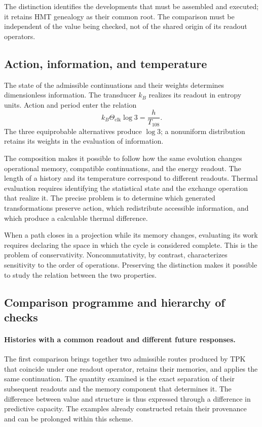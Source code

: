 The distinction identifies the developments that must be assembled and
executed; it retains HMT genealogy as their common root. The comparison
must be independent of the value being checked, not of
the shared origin of its readout operators.

\subsection{Action, information, and temperature}
\label{md:lectin:termica}

The state of the admissible continuations and their weights determines
dimensionless information. The transducer $k_B$ realizes its readout in
entropy units. Action and period enter the relation
\begin{equation}
 k_B\Theta_{\mathrm{clk}}\log3=\frac{h}{T_{108}}.
 \label{md:lectin:accion-informacion}
\end{equation}
The three equiprobable alternatives produce $\log3$; a nonuniform
distribution retains its weights in the evaluation of information.

The composition makes it possible to follow how the same evolution changes
operational memory, compatible continuations, and the energy
readout. The length of a history and its temperature correspond
to different readouts. Thermal evaluation requires identifying the
statistical state and the exchange operation that realize it.
The precise problem is to determine which generated transformations
preserve action, which redistribute accessible information,
and which produce a calculable thermal difference.

When a path closes in a projection while its memory changes,
evaluating its work requires declaring the space in which
the cycle is considered complete. This is the problem of
conservativity. Noncommutativity, by contrast, characterizes
sensitivity to the order of operations. Preserving the distinction
makes it possible to study the relation between the two properties.

\subsection{Comparison programme and hierarchy of checks}
\label{md:lectin:contrastes}

\paragraph{Histories with a common readout and different future responses.}
The first comparison brings together two admissible routes produced by TPK
that coincide under one readout operator, retains their memories, and applies the same
continuation. The quantity examined is the exact separation of their
subsequent readouts and the memory component that determines it.
The difference between value and structure is thus expressed through a
difference in predictive capacity. The examples already constructed
retain their provenance and can be prolonged within this scheme.

